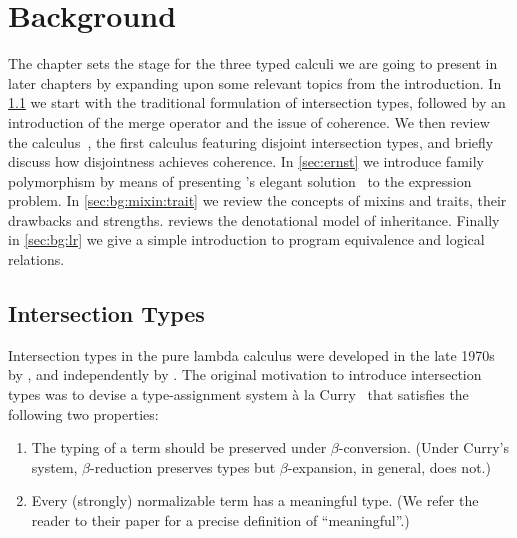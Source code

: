 
\chapter{Background}
\label{chap:background}

The chapter sets the stage for the three typed calculi we are going to present
in later chapters by expanding upon some relevant topics from the introduction.
In \cref{bg:sec:intersection} we start with the traditional formulation of
intersection types, followed by an introduction of the merge operator and the
issue of coherence. We then review the \oname calculus~\citep{oliveira2016disjoint}, the first calculus
featuring disjoint intersection types, and briefly discuss how disjointness
achieves coherence. In \cref{sec:ernst} we introduce family polymorphism by
means of presenting \citeauthor{ernst2004expression}'s elegant solution~\citep{ernst2004expression} to the
expression problem. In \cref{sec:bg:mixin:trait} we review the concepts of
mixins and traits, their drawbacks and strengths.  reviews
the denotational model of inheritance. Finally in \cref{sec:bg:lr} we give a
simple introduction to program equivalence and logical relations.




\section{Intersection Types}
\label{bg:sec:intersection}


Intersection types in the pure lambda calculus were developed in the late
1970s by \citet{coppoInter}, and independently by \citet{pottinger1980type}. The
original motivation to introduce intersection types was to devise a
type-assignment system \`a la Curry~\citep{CurryFeys} that satisfies the
following two properties:
\begin{enumerate}
\item The typing of a term should be preserved under $\beta$-conversion. (Under
  Curry's system, $\beta$-reduction preserves types but $\beta$-expansion, in
  general, does not.)
\item Every (strongly) normalizable term has a meaningful type. (We refer the
  reader to their paper for a precise definition of ``meaningful''.)
\end{enumerate}

